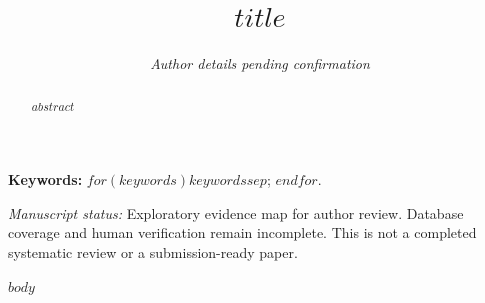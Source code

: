 \documentclass[11pt,a4paper]{article}
\title{$title$}
\author{\textit{Author details pending confirmation}}
\date{}
\begin{document}
\maketitle
\begin{abstract}
$abstract$
\end{abstract}
\noindent\textbf{Keywords:} $for(keywords)$$keywords$$sep$; $endfor$.
\par\medskip
\noindent\textit{Manuscript status:} Exploratory evidence map for author review. Database coverage and human verification remain incomplete. This is not a completed systematic review or a submission-ready paper.
\par\medskip
$body$
\clearpage
{}
{}


\end{document}

